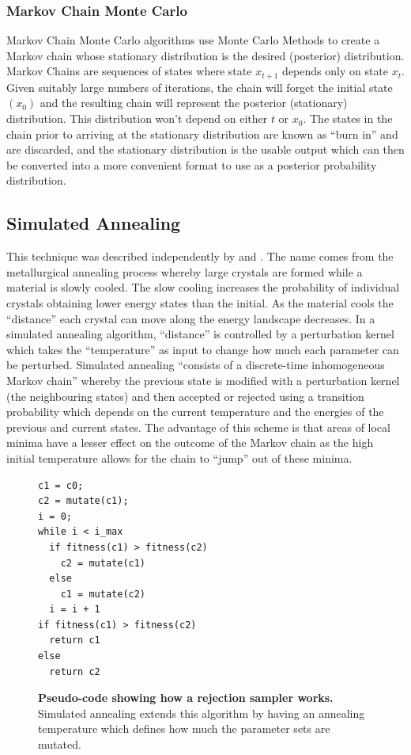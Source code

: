 \subsubsection{Markov Chain Monte Carlo}
Markov Chain Monte Carlo algorithms use Monte Carlo Methods to create a Markov chain whose stationary distribution is the desired (posterior) distribution. Markov Chains are sequences of states where state $x_{t+1}$ depends only on state $x_t$. Given suitably large numbers of iterations, the chain will forget the initial state $(x_0)$ and the resulting chain will represent the posterior (stationary) distribution. This distribution won't depend on either $t$ or $x_0$\cite{Gilks1996}. The states in the chain prior to arriving at the stationary distribution are known as ``burn in'' and are discarded, and the stationary distribution is the usable output which can then be converted into a more convenient format to use as a posterior probability distribution.

\subsection{Simulated Annealing}
This technique was described independently by \citet{Kirkpatrick1983} and \citet{Cerny1985}. The name comes from the metallurgical annealing process whereby large crystals are formed while a material is slowly cooled. The slow cooling increases the probability of individual crystals obtaining lower energy states than the initial. As the material cools the ``distance'' each crystal can move along the energy landscape decreases. In a simulated annealing algorithm, ``distance'' is controlled by a perturbation kernel which takes the ``temperature'' as input to change how much each parameter can be perturbed.
Simulated annealing ``consists of a discrete-time inhomogeneous Markov chain''\cite{Bertsimas1993} whereby the previous state is modified with a perturbation kernel (the neighbouring states) and then accepted or rejected using a transition probability which depends on the current temperature and the energies of the previous and current states. The advantage of this scheme is that areas of local minima have a lesser effect on the outcome of the Markov chain as the high initial temperature allows for the chain to ``jump'' out of these minima.

\begin{figure}[htbp]
\small
\begin{verbatim}
c1 = c0;
c2 = mutate(c1);
i = 0;
while i < i_max
  if fitness(c1) > fitness(c2)
    c2 = mutate(c1)
  else
    c1 = mutate(c2)
  i = i + 1
if fitness(c1) > fitness(c2)
  return c1
else
  return c2
\end{verbatim}
\caption[Pseudo-code showing how rejection sampler works.]{{\bf Pseudo-code showing how a rejection sampler works.} Simulated annealing extends this algorithm by having an annealing temperature which defines how much the parameter sets are mutated.
\label{fig:sa_code}}
\end{figure}

